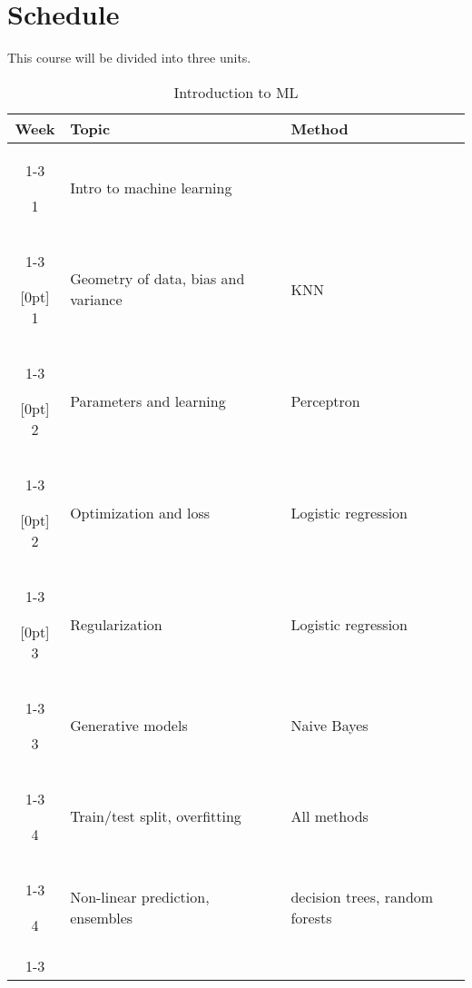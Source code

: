 \documentclass[10pt]{memoir}
\begin{document}
\clearpage

\section{\textbf{Schedule}}

This course will be divided into three units. \\

\begin{table}[htb!]
\centering
\begin{tabular}{cll}
     \textbf{Week} & \textbf{Topic} & \textbf{Method}   \\
    \cmidrule[.1em](lr){1-3}
    
     1 & Intro to machine learning &  \\
    \cmidrule[.1em](lr){1-3} 
 
     \multirow{1}{*}[0pt]{\textit{}} 
         1  & Geometry of data, bias and variance & KNN  \\ 
        \cmidrule[.1em](lr){1-3}
        
    \multirow{1}{*}[0pt]{\textit{}} 
         2  & Parameters and learning & Perceptron   \\ \cmidrule[.1em](lr){1-3}

    \multirow{1}{*}[0pt]{} 
         2 & Optimization and loss & Logistic regression \\   \cmidrule[.1em](lr){1-3}    

   \multirow{1}{*}[0pt]{} %
         3 &  Regularization & Logistic regression  \\ \cmidrule[.1em](lr){1-3}             

     3 & Generative models & Naive Bayes \\
    \cmidrule[.1em](lr){1-3} 

    4  &  Train/test split, overfitting  &  All methods  \\
    \cmidrule[.1em](lr){1-3}

   4   & Non-linear prediction, ensembles  & decision trees, random forests \\
    \cmidrule[.1em](lr){1-3}

\end{tabular}\\
\caption{Introduction to ML}
\end{table}
\end{document}
